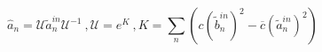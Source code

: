 \begin{equation}\label{defUK}
\hat{a}_n=\mathcal{U}\tilde{a}_n^{in}
\mathcal{U}^{-1} \ ,
\mathcal{U}=e^K \ , 
K=\sum_n  (c(\tilde{b}_n^{in})^2-\overline{c}
(\tilde{a}_n^{in})^2) \ 
\end{equation}

